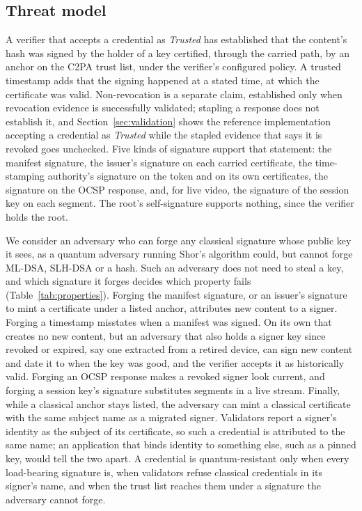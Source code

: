 \subsection{Threat model}
\label{sec:threat}

A verifier that accepts a credential as \emph{Trusted} has established that
the content's hash was signed by the holder of a key certified, through the
carried path, by an anchor on the C2PA trust list, under the verifier's
configured policy. A trusted timestamp adds that the signing happened at a
stated time, at which the certificate was valid. Non-revocation is a separate
claim, established only when revocation evidence is successfully validated;
stapling a response does not establish it, and
Section~\ref{sec:validation} shows the reference implementation accepting a
credential as \emph{Trusted} while the stapled evidence that says it is
revoked goes unchecked. Five
kinds of signature support that statement: the manifest signature, the
issuer's signature on each carried certificate, the time-stamping authority's
signature on the token and on its own certificates, the signature on the OCSP
response, and, for live video, the signature of the session key on each
segment. The root's self-signature supports nothing, since the verifier holds
the root.

We consider an adversary who can forge any classical signature whose public key
it sees, as a quantum adversary running Shor's algorithm could, but cannot
forge ML-DSA, SLH-DSA or a hash. Such an adversary does not need to steal a
key, and which signature it forges decides which property fails
(Table~\ref{tab:properties}). Forging the manifest signature, or an issuer's
signature to mint a certificate under a listed anchor, attributes new content
to a signer. Forging a timestamp misstates when a manifest was signed. On its
own that creates no new content, but an adversary that also holds a signer key
since revoked or expired, say one extracted from a retired device, can sign
new content and date it to when the key was good, and the verifier accepts it
as historically valid. Forging an OCSP response makes a revoked signer look
current, and forging a session key's signature substitutes segments in a live
stream. Finally, while a classical anchor stays listed, the adversary can mint
a classical certificate with the same subject name as a migrated signer.
Validators report a signer's identity as the subject of its certificate, so
such a credential is attributed to the same name; an application that binds
identity to something else, such as a pinned key, would tell the two apart. A
credential is quantum-resistant only when every load-bearing signature is,
when validators refuse classical credentials in its signer's name, and when
the trust list reaches them under a signature the adversary cannot forge.

